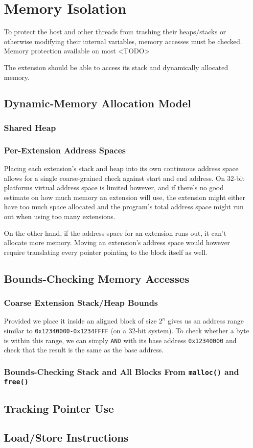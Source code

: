 \chapter{Memory Isolation}

To protect the host and other threads from trashing their heaps/stacks or
otherwise modifying their internal variables, memory accesses must be checked.
Memory protection available on most <TODO>

The extension should be able to access its stack and dynamically allocated
memory.

\section{Dynamic-Memory Allocation Model}

\subsection{Shared Heap}

\subsection{Per-Extension Address Spaces}

Placing each extension's stack and heap into its own continuous address space
allows for a single coarse-grained check against start and end address. On
32-bit platforms virtual address space is limited however, and if there's no
good estimate on how much memory an extension will use, the extension might
either have too much space allocated and the program's total address space
might run out when using too many extensions.

On the other hand, if the address space for an extension runs out, it can't
allocate more memory. Moving an extension's address space would however require
translating every pointer pointing to the block itself as well.


\section {Bounds-Checking Memory Accesses}

\subsection{Coarse Extension Stack/Heap Bounds}

Provided we place it inside an aligned block of size $2^n$ gives us an address
range similar to \texttt{0x12340000-0x1234FFFF} (on a 32-bit system). To check
whether a byte is within this range, we can simply \texttt{AND} with its base
address \texttt{0x12340000} and check that the result is the same as the base
address.

\subsection{Bounds-Checking Stack and All Blocks From \texttt{malloc()}
	and \texttt{free()}}

\section{Tracking Pointer Use}

\section{Load/Store Instructions}


